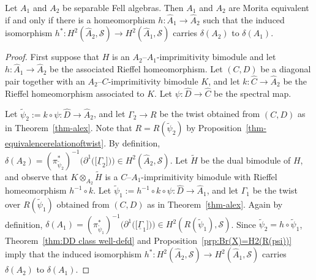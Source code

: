 \documentclass[12pt,a4paper]{amsart}
\newcommand{\Tgerms}{\mathcal{S}}
\begin{document}
\begin{thm}\label{thm:DD classification}
Let $A_1$ and $A_2$ be separable Fell algebras. Then $A_1$ and
$A_2$ are Morita equivalent if and only if there is a
homeomorphism $h : \widehat{A}_1 \to \widehat{A}_2$ such that
the induced isomorphism $h^* : H^2(\widehat{A}_2, \Tgerms) \to
H^2(\widehat{A}_1, \Tgerms)$ carries $\delta(A_2)$ to
$\delta(A_1)$.
\end{thm}
\begin{proof}
First suppose that $H$ is an $A_2$--$A_1$-imprimitivity bimodule
and let $h : \widehat{A}_1 \to \widehat{A}_2$ be the associated
Rieffel homeomorphism. Let $(C, D)$ be a diagonal pair together
with an $A_2$--$C$-imprimitivity bimodule $K$, and let $k :
\widehat{C} \to \widehat{A}_2$ be the Rieffel homeomorphism
associated to $K$. Let $\psi : \widehat{D} \to \widehat{C}$ be
the spectral map.

Let $\tilde\psi_2 := k \circ \psi : \widehat{D} \to
\widehat{A}_2$, and let $\Gamma_2\to R$ be the twist obtained
from $(C, D)$ as in Theorem~\ref{thm-alex}.  Note that
$R=R(\tilde\psi_2)$ by
Proposition~\ref{thm-equivalencerelationoftwist}. By
definition, $\delta(A_2) = (\pi_{\tilde{\psi}_2}^*)^{-1}\big(
\partial^1\big(\!\big[\underline{\Gamma}_2\big]\!\big)\big) \in
H^2(\widehat{A}_2, \Tgerms)$. Let $\tilde{H}$ be the dual
bimodule of $H$, and observe that $K \otimes_{A_2} \tilde H$ is
a $C$--$A_1$-imprimitivity bimodule with Rieffel homeomorphism
$h^{-1} \circ k$. Let $\tilde\psi_1 := h^{-1} \circ k \circ \psi
: \widehat{D} \to \widehat{A}_1$, and let $\Gamma_1$ be the
twist over $R(\tilde\psi_1)$ obtained from $(C, D)$ as in
Theorem~\ref{thm-alex}. Again by definition, $\delta(A_1) =
(\pi_{\tilde\psi_1}^*)^{-1}\big(\partial^1\big(\!\big[\underline{\Gamma}_1\big]\!\big)\big)
\in H^2(R(\tilde\psi_1), \Tgerms)$. Since $\tilde\psi_2 = h
\circ \tilde\psi_1$, Theorem~\ref{thm:DD class well-defd} and
Proposition~\ref{prp:Br(X)=H2(R(psi))} imply that the induced
isomorphism $h^* : H^2(\widehat{A}_2, \Tgerms) \to
H^2(\widehat{A}_1,\Tgerms)$ carries $\delta(A_2)$ to
$\delta(A_1)$.


\end{proof}
\end{document}
